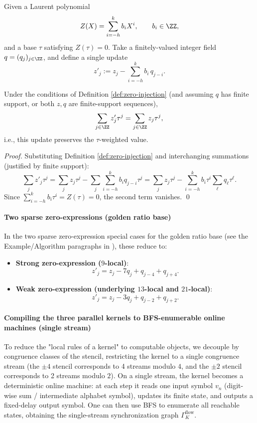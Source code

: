 \begin{definition}\label{def:zero-injection}
Given a Laurent polynomial
$$
Z(X)=\sum_{i=-h}^{k}b_iX^i,\qquad b_i\in\ZZ,
$$
and a base $\tau$ satisfying $Z(\tau)=0$. Take a finitely-valued integer field $q=(q_j)_{j\in\ZZ}$, and define a single update
$$
z'_j:=z_j-\sum_{i=-h}^{k}b_i\,q_{j-i}.
$$
\end{definition}

\begin{proposition}\label{prop:zero-injection-value-preserving}
Under the conditions of Definition \ref{def:zero-injection} (and assuming $q$ has finite support, or both $z,q$ are finite-support sequences),
\[
\sum_{j\in\ZZ} z'_j\tau^j=\sum_{j\in\ZZ} z_j\tau^j,
\]
i.e., this update preserves the $\tau$-weighted value.
\end{proposition}

\begin{proof}
Substituting Definition \ref{def:zero-injection} and interchanging summations (justified by finite support):
\[
\sum_j z'_j\tau^j=\sum_j z_j\tau^j-\sum_j\sum_{i=-h}^{k}b_i q_{j-i}\tau^j
=\sum_j z_j\tau^j-\sum_{i=-h}^{k}b_i\tau^i\sum_\ell q_{\ell}\tau^{\ell}.
\]
Since $\sum_{i=-h}^{k}b_i\tau^i=Z(\tau)=0$, the second term vanishes. \qed
\end{proof}

\paragraph{Two sparse zero-expressions (golden ratio base)}
In the two sparse zero-expression special cases for the golden ratio base (see the Example/Algorithm paragraphs in \cite{FrougnyHellerPelantovaSvobodovaParallelAlgorithmsSlides}), these reduce to:
\begin{itemize}
  \item \textbf{Strong zero-expression ($9$-local)}:
  $$
  z'_j=z_j-7q_j+q_{j-4}+q_{j+4}.
  $$
  \item \textbf{Weak zero-expression (underlying $13$-local and $21$-local)}:
  $$
  z'_j=z_j-3q_j+q_{j-2}+q_{j+2}.
  $$
\end{itemize}

\paragraph{Compiling the three parallel kernels to BFS-enumerable online machines (single stream)}
To reduce the "local rules of a kernel" to computable objects, we decouple by congruence classes of the stencil, restricting the kernel to a single congruence stream (the $\pm 4$ stencil corresponds to 4 streams modulo $4$, and the $\pm 2$ stencil corresponds to 2 streams modulo $2$). On a single stream, the kernel becomes a deterministic online machine: at each step it reads one input symbol $v_n$ (digit-wise sum / intermediate alphabet symbol), updates its finite state, and outputs a fixed-delay output symbol. One can then use BFS to enumerate all reachable states, obtaining the single-stream synchronization graph $\Gamma^{\mathrm{flow}}_K$.

